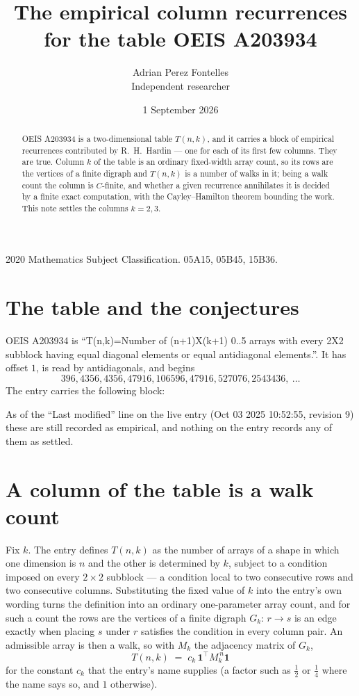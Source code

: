 \documentclass[11pt,a4paper]{article}
\title{The empirical column recurrences for the table OEIS A203934}
\author{Adrian Perez Fontelles\\ \small Independent researcher}
\date{1 September 2026}
\theoremstyle{plain}
\theoremstyle{definition}
\begin{document}
\maketitle

\begin{abstract}
OEIS A203934 is a two-dimensional table $T(n,k)$, and it carries a block of empirical
recurrences contributed by R.~H.~Hardin --- one for each of its first few columns. They are
true. Column $k$ of the table is an ordinary fixed-width array count, so its rows are the
vertices of a finite digraph and $T(n,k)$ is a number of walks in it; being a walk count the
column is $C$-finite, and whether a given recurrence annihilates it is decided by a finite
exact computation, with the Cayley--Hamilton theorem bounding the work. This note settles the
columns $k=2, 3$.
\end{abstract}

\noindent\small 2020 Mathematics Subject Classification. 05A15, 05B45, 15B36.\normalsize

\section{The table and the conjectures}

OEIS A203934 is ``T(n,k)=Number of (n+1)X(k+1) 0..5 arrays with every 2X2 subblock having equal diagonal elements or equal antidiagonal elements.''. It has offset $1$, is
read by antidiagonals, and begins
\[
396, 4356, 4356, 47916, 106596, 47916, 527076, 2543436,\ \dots
\]
The entry carries the following block:
\begin{quote}\small

\end{quote}
As of the ``Last modified'' line on the live entry (Oct 03 2025 10:52:55, revision 9) these are still
recorded as empirical, and nothing on the entry records any of them as settled.

\section{A column of the table is a walk count}

Fix $k$. The entry defines $T(n,k)$ as the number of arrays of a shape in which one dimension
is $n$ and the other is determined by $k$, subject to a condition imposed on every
$2\times2$ subblock --- a condition local to two consecutive rows and two consecutive columns.
Substituting the fixed value of $k$ into the entry's own wording turns the definition into an
ordinary one-parameter array count, and for such a count the rows are the vertices of a finite
digraph $G_k$: $r\to s$ is an edge exactly when placing $s$ under $r$ satisfies the condition
in every column pair. An admissible array is then a walk, so with $M_k$ the adjacency matrix
of $G_k$,
\[
T(n,k)\;=\;c_k\,\mathbf{1}^{\!\top}M_k^{\,n}\mathbf{1}
\]
for the constant $c_k$ that the entry's name supplies (a factor such as $\tfrac12$ or
$\tfrac14$ where the name says so, and $1$ otherwise).
\end{document}
